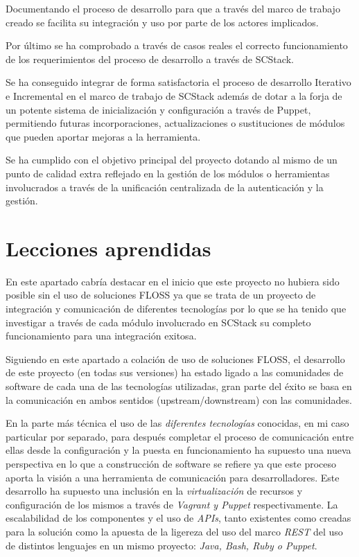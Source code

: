\par Documentando el proceso de desarrollo para que a través del marco de trabajo creado se facilita su integración y uso por parte de los actores implicados.

\par Por último se ha comprobado a través de casos reales el correcto funcionamiento de los requerimientos del proceso de desarrollo a través de SCStack.

\par Se ha conseguido integrar de forma satisfactoria el proceso de desarrollo Iterativo e Incremental en el marco de trabajo de SCStack además de dotar a la forja de un potente sistema de inicialización y configuración a través de Puppet, permitiendo futuras incorporaciones, actualizaciones o sustituciones de módulos que pueden aportar mejoras a la herramienta.

\par Se ha cumplido con el objetivo principal del proyecto dotando al mismo de un punto de calidad extra reflejado en la gestión de los módulos o herramientas involucrados a través de la unificación centralizada de la autenticación y la gestión.

\section{Lecciones aprendidas}
\label{sec:lecciones}

\par En este apartado cabría destacar en el inicio que este proyecto no hubiera sido posible sin el uso de soluciones FLOSS ya que se trata de un proyecto de integración y comunicación de diferentes tecnologías por lo que se ha tenido que investigar a través de cada módulo involucrado en SCStack su completo funcionamiento para una integración exitosa.

\par Siguiendo en este apartado a colación de uso de soluciones FLOSS, el desarrollo de este proyecto (en todas sus versiones) ha estado ligado a las comunidades de software de cada una de las tecnologías utilizadas, gran parte del éxito se basa en la comunicación en ambos sentidos (upstream/downstream) con las comunidades.

\par En la parte más técnica el uso de las \emph{diferentes tecnologías} conocidas, en mi caso particular por separado, para después completar el proceso de comunicación entre ellas desde la configuración y la puesta en funcionamiento ha supuesto una nueva perspectiva en lo que a construcción de software se refiere ya que este proceso aporta la visión a una herramienta de comunicación para desarrolladores. Este desarrollo ha supuesto una inclusión en la \emph{virtualización} de recursos y configuración de los mismos a través de \emph{Vagrant y Puppet} respectivamente. La escalabilidad de los componentes y el uso de \emph{APIs}, tanto existentes como creadas para la solución como la apuesta de la ligereza del uso del marco \emph{REST} del uso de distintos lenguajes en un mismo proyecto: \emph{Java, Bash, Ruby o Puppet}.

